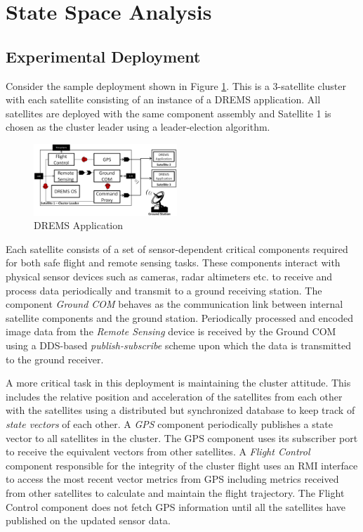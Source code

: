 \section{State Space Analysis}
\label{sec:State_Space_Analysis}

\subsection{Experimental Deployment}

Consider the sample deployment shown in Figure \ref{fig:CT}. This is a 3-satellite cluster with each satellite consisting of an instance of a DREMS application. All satellites are deployed with the same component assembly and Satellite 1 is chosen as the cluster leader using a leader-election algorithm. 

\begin{figure}[htb]
	\centering
	\includegraphics[width=0.48\textwidth]{figs/Case_Study_Fixed.png}
	\caption{DREMS Application}
	\label{fig:CT}
\end{figure}

Each satellite consists of a set of sensor-dependent critical components required for both safe flight and remote sensing tasks. These components interact with physical sensor devices such as cameras, radar altimeters etc. to receive and process data periodically and transmit to a ground receiving station. The component \emph{Ground COM} behaves as the communication link between internal satellite components and the ground station. Periodically processed and encoded image data from the \emph{Remote Sensing} device is received by the Ground COM using a DDS-based \emph{publish-subscribe} scheme upon which the data is transmitted to the ground receiver. 

A more critical task in this deployment is maintaining the cluster attitude. This includes the relative position and acceleration of the satellites from each other with the satellites using a distributed but synchronized database to keep track of \emph{state vectors} of each other. A \emph{GPS} component periodically publishes a state vector to all satellites in the cluster. The GPS component uses its subscriber port to receive the equivalent vectors from other satellites. A \emph{Flight Control} component responsible for the integrity of the cluster flight uses an RMI interface to access the most recent vector metrics from GPS including metrics received from other satellites to calculate and maintain the flight trajectory. The Flight Control component does not fetch GPS information until all the satellites have published on the updated sensor data. 

